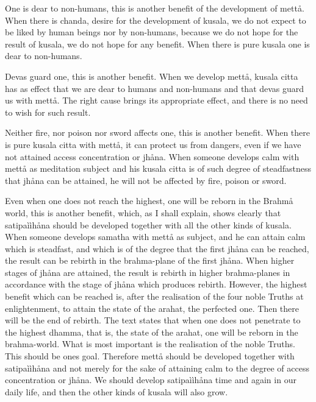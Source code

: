 \documentclass[12pt,twoside]{article}
\begin{document}
{\textasciigrave}{\textasciigrave}One is dear to
non{}-humans{\textquotesingle}{\textquotesingle}, this is another
benefit of the development of mett{\aa}. When there is chanda, desire
for the development of kusala, we do not expect to be liked by human
beings nor by non{}-humans, because we do not hope for the result of
kusala, we do not hope for any benefit. When there is pure kusala one
is dear to non{}-humans. 

{\textasciigrave}{\textasciigrave}Devas guard
one{\textquotesingle}{\textquotesingle}, this is another benefit. When
we develop mett{\aa}, kusala citta has as effect that we are dear to
humans and non{}-humans and that devas guard us with mett{\aa}. The
right cause brings its appropriate effect, and there is no need to wish
for such result. 

{\textasciigrave}{\textasciigrave}Neither fire, nor poison nor sword
affects one{\textquotesingle}{\textquotesingle}, this is another
benefit. When there is pure kusala citta with mett{\aa}, it can protect
us from dangers, even if we have not attained
{\textasciigrave}{\textasciigrave}access
concentration{\textquotesingle}{\textquotesingle} or jh{\aa}na. When
someone develops calm with mett{\aa} as meditation subject and his
kusala citta is of such degree of steadfastness that jh{\aa}na can be
attained, he will not be affected by fire, poison or sword. 

{\textasciigrave}{\textasciigrave}Even when one does not reach the
highest, one will be reborn in the Brahm{\aa}
world{\textquotesingle}{\textquotesingle}, this is another benefit,
which, as I shall explain, shows clearly that satipa\`i\`ih{\aa}na
should be developed together with all the other kinds of kusala. When
someone develops samatha with mett{\aa} as subject, and he can attain
calm which is steadfast, and which is of the degree that the first
jh{\aa}na can be reached, the result can be rebirth in the
brahma{}-plane of the first jh{\aa}na. When higher stages of jh{\aa}na
are attained, the result is rebirth in higher brahma{}-planes in
accordance with the stage of jh{\aa}na which produces rebirth. However,
the highest benefit which can be reached is, after the realisation of
the four noble Truths at enlightenment, to attain the state of the
arahat, the perfected one. Then there will be the end of rebirth. The
text states that when one does not penetrate to the highest dhamma,
that is, the state of the arahat, one will be reborn in the
brahma{}-world. What is most important is the realisation of the noble
Truths. This should be one{\textquotesingle}s goal. Therefore mett{\aa}
should be developed together with satipa\`i\`ih{\aa}na and not merely
for the sake of attaining calm to the degree of access concentration or
jh{\aa}na. We should develop satipa\`i\`ih{\aa}na time and again in our
daily life, and then the other kinds of kusala will also grow. 
\end{document}
